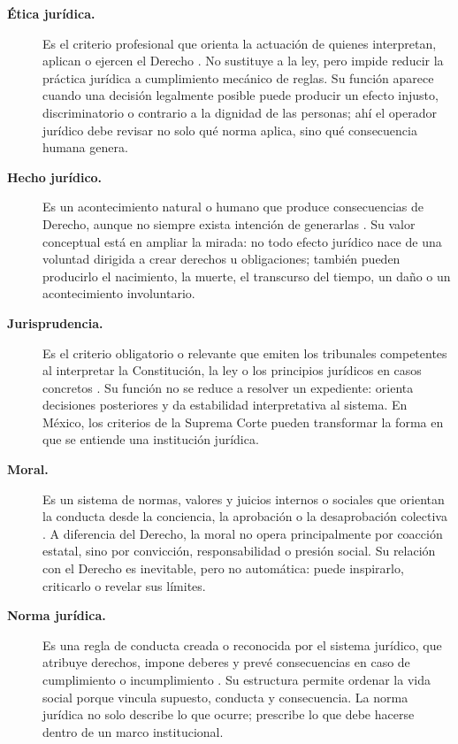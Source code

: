 \documentclass[
	spanish,
	letterpaper, oneside
]{article}
\begin{document}
\begin{description}
\item[\textbf{Ética jurídica.}]
Es el criterio profesional que orienta la actuación de quienes interpretan, aplican o ejercen el Derecho \citep{launDerechoMoral2021,rodriguezFilosofiaDerecho2020}. No sustituye a la ley, pero impide reducir la práctica jurídica a cumplimiento mecánico de reglas. Su función aparece cuando una decisión legalmente posible puede producir un efecto injusto, discriminatorio o contrario a la dignidad de las personas; ahí el operador jurídico debe revisar no solo qué norma aplica, sino qué consecuencia humana genera.

\item[\textbf{Hecho jurídico.}]
Es un acontecimiento natural o humano que produce consecuencias de Derecho, aunque no siempre exista intención de generarlas \citep{garciaMaynez2002,poderJudicialGto2007}. Su valor conceptual está en ampliar la mirada: no todo efecto jurídico nace de una voluntad dirigida a crear derechos u obligaciones; también pueden producirlo el nacimiento, la muerte, el transcurso del tiempo, un daño o un acontecimiento involuntario.

\item[\textbf{Jurisprudencia.}]
Es el criterio obligatorio o relevante que emiten los tribunales competentes al interpretar la Constitución, la ley o los principios jurídicos en casos concretos \citep{garciaMaynez2002,scjnMatrimonio2015}. Su función no se reduce a resolver un expediente: orienta decisiones posteriores y da estabilidad interpretativa al sistema. En México, los criterios de la Suprema Corte pueden transformar la forma en que se entiende una institución jurídica.

\item[\textbf{Moral.}]
Es un sistema de normas, valores y juicios internos o sociales que orientan la conducta desde la conciencia, la aprobación o la desaprobación colectiva \citep{launDerechoMoral2021,garciaMaynez2002}. A diferencia del Derecho, la moral no opera principalmente por coacción estatal, sino por convicción, responsabilidad o presión social. Su relación con el Derecho es inevitable, pero no automática: puede inspirarlo, criticarlo o revelar sus límites.

\item[\textbf{Norma jurídica.}]
Es una regla de conducta creada o reconocida por el sistema jurídico, que atribuye derechos, impone deberes y prevé consecuencias en caso de cumplimiento o incumplimiento \citep{garciaMaynez2002,poderJudicialGto2007}. Su estructura permite ordenar la vida social porque vincula supuesto, conducta y consecuencia. La norma jurídica no solo describe lo que ocurre; prescribe lo que debe hacerse dentro de un marco institucional.


\end{description}
\end{document}
